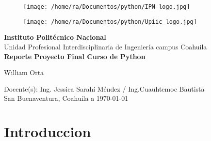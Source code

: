 \documentclass[12pt]{article}
\author{William Orta}
\date{\today} %
\begin{document}
	\begin{figure}[h!]
		\begin{minipage}[t]{0.32\textwidth}
			\centering
			\texttt{[image: /home/ra/Documentos/python/IPN-logo.jpg]}
			\label{fig:imagen1}
		\end{minipage}\hfill
		\begin{minipage}[t]{0.25\textwidth}
			\centering
			\texttt{[image: /home/ra/Documentos/python/Upiic\_logo.jpg]}
			\label{fig:imagen2}
		\end{minipage}
	\end{figure}
\begin{center}
	
	\vspace*{1.5cm}
	\LARGE
	\textbf{Instituto Politécnico Nacional}
	\vspace{0.5cm}
	\\Unidad Profesional Interdisciplinaria de Ingeniería campus Coahuila\\
	\vspace{1cm}
	\textbf{Reporte Proyecto Final Curso de Python}\\
	\vspace{0.1cm}
	
William Orta
	\vfill

	\vspace{0.25cm}
	Docente(s): Ing. Jessica Sarahí Méndez / Ing.Cuauhtemoc Bautista
	 \\
	\vspace{0.25cm}
	\Large
	San Buenaventura, Coahuila a \today
	
\end{center}
	\begin{minipage}[t]{1.00\textwidth}
		\centering
	\end{minipage}
	\newpage
	
	\section{Introduccion}
	
\end{document}
